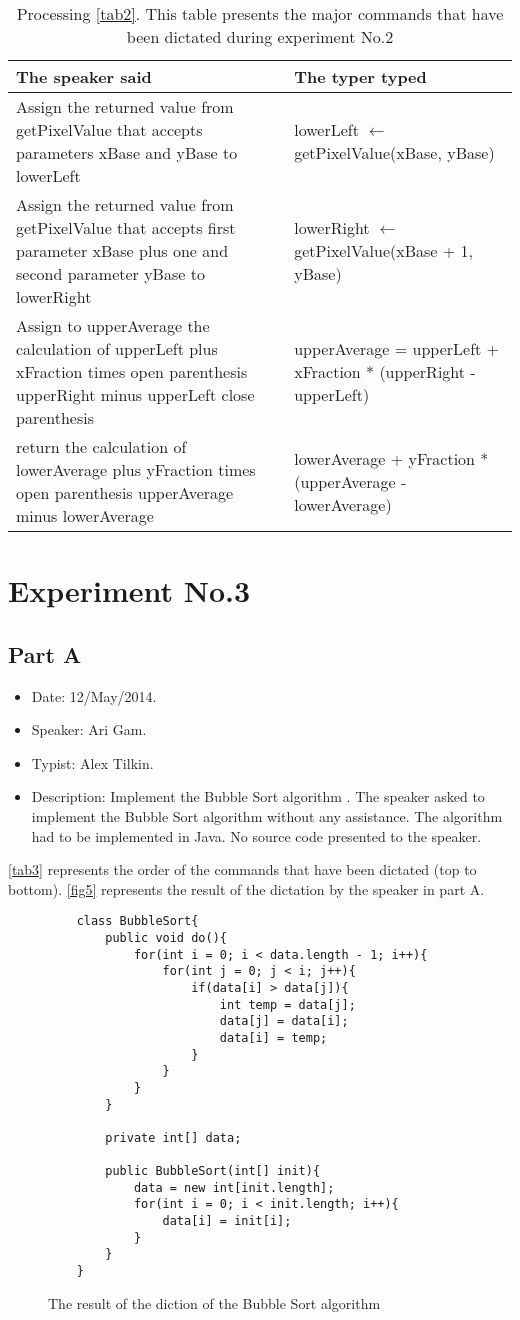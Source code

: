 \begin{table}[H]
	\begin{tabular}{|p{10cm}|p{6cm}|}
		\hline
		\rowcolor[HTML]{9B9B9B} 
		{\color[HTML]{000000} The speaker said} & {\color[HTML]{000000} The typer typed} \\ \hline
		Assign the returned value from getPixelValue that accepts parameters xBase and yBase to lowerLeft & lowerLeft $\leftarrow$ getPixelValue(xBase, yBase) \\ \hline
		Assign the returned value from getPixelValue that accepts first parameter xBase plus one and second parameter yBase to lowerRight & lowerRight $\leftarrow$ getPixelValue(xBase + 1, yBase) \\ \hline
		Assign to upperAverage the calculation of upperLeft plus xFraction times open parenthesis upperRight minus upperLeft close parenthesis & upperAverage = upperLeft + xFraction * (upperRight - upperLeft) \\ \hline
		return the calculation of lowerAverage plus yFraction times open parenthesis upperAverage minus lowerAverage & lowerAverage + yFraction * (upperAverage - lowerAverage) \\ \hline
	\end{tabular}
	\caption{Processing \autoref{tab2}. This table presents the major commands that have been dictated during experiment No.2}
	\label{tab8}
\end{table}
\section{Experiment No.3}
\subsection{Part A}
\begin{itemize}
	\item Date: 12/May/2014.
	\item Speaker: Ari Gam.
	\item Typist: Alex Tilkin.
	\item Description: Implement the Bubble Sort algorithm . The speaker asked to implement the Bubble Sort algorithm without any assistance. The algorithm had to be implemented in Java. No source code presented to the speaker.
\end{itemize}
\autoref{tab3} represents the order of the commands that have been dictated (top to bottom). \autoref{fig5} represents the result of the dictation by the speaker in part A.
\begin{figure}[H]
	\begin{lstlisting}
	class BubbleSort{
		public void do(){
			for(int i = 0; i < data.length - 1; i++){
				for(int j = 0; j < i; j++){
					if(data[i] > data[j]){
						int temp = data[j];
						data[j] = data[i];
						data[i] = temp;
					}
				}
			}
		}
		
		private int[] data;
		
		public BubbleSort(int[] init){
			data = new int[init.length];
			for(int i = 0; i < init.length; i++){
				data[i] = init[i];
			}
		}
	}
	\end{lstlisting}
	\caption{The result of the diction of the Bubble Sort algorithm}
	\label{fig5}
\end{figure}
